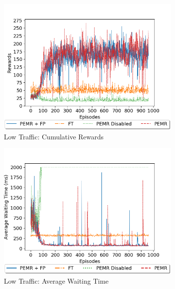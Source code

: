 \documentclass{llncs}
\begin{document}
\begin{figure}[ht!]
    \centering
    \begin{subfigure}[b]{0.48\textwidth}
        \includegraphics[width=\textwidth]{images/Low-Load-REW.png}
  		\caption{Low Traffic: Cumulative Rewards}
  		\label{fig:LowIDQNREW}
    \end{subfigure}
    \begin{subfigure}[b]{0.48\textwidth}
        \includegraphics[width=\textwidth]{images/Low-Load-AWT.png}
  		\caption{Low Traffic: Average Waiting Time}
  		\label{fig:LowIDQNAWT}
    \end{subfigure}
     \begin{subfigure}[b]{0.48\textwidth}

\end{subfigure}
\end{figure}
\end{document}
